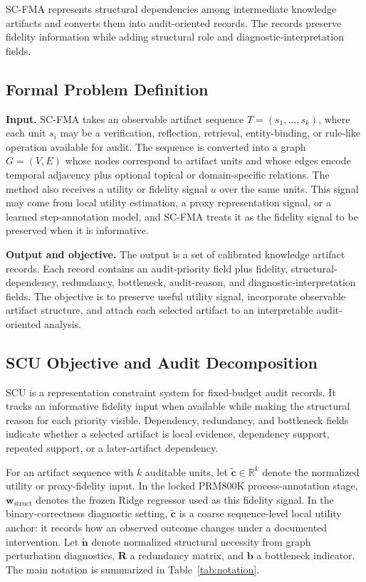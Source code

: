 \documentclass[a4paper,fleqn]{cas-sc}
\newcommand{\wstruct}{\ensuremath{\mathbf{w}_{\mathrm{struct}}}}
\begin{document}
SC-FMA represents structural dependencies among intermediate knowledge artifacts and converts them into audit-oriented records. The records preserve fidelity information while adding structural role and diagnostic-interpretation fields.

\subsection{Formal Problem Definition}

\textbf{Input.} SC-FMA takes an observable artifact sequence $T=(s_1,\ldots,s_k)$, where each unit $s_i$ may be a verification, reflection, retrieval, entity-binding, or rule-like operation available for audit. The sequence is converted into a graph $G=(V,E)$ whose nodes correspond to artifact units and whose edges encode temporal adjacency plus optional topical or domain-specific relations. The method also receives a utility or fidelity signal $u$ over the same units. This signal may come from local utility estimation, a proxy representation signal, or a learned step-annotation model, and SC-FMA treats it as the fidelity signal to be preserved when it is informative.

\textbf{Output and objective.} The output is a set of calibrated knowledge artifact records. Each record contains an audit-priority field plus fidelity, structural-dependency, redundancy, bottleneck, audit-reason, and diagnostic-interpretation fields. The objective is to preserve useful utility signal, incorporate observable artifact structure, and attach each selected artifact to an interpretable audit-oriented analysis.

\subsection{SCU Objective and Audit Decomposition}
\label{sec:scu-objective}

SCU is a representation constraint system for fixed-budget audit records. It tracks an informative fidelity input when available while making the structural reason for each priority visible. Dependency, redundancy, and bottleneck fields indicate whether a selected artifact is local evidence, dependency support, repeated support, or a later-artifact dependency.

For an artifact sequence with $k$ auditable units, let $\tilde{\mathbf{c}}\in\mathbb{R}^k$ denote the normalized utility or proxy-fidelity input. In the locked PRM800K process-annotation stage, \wstruct{} denotes the frozen Ridge regressor used as this fidelity signal. In the binary-correctness diagnostic setting, $\tilde{\mathbf{c}}$ is a coarse sequence-level local utility anchor: it records how an observed outcome changes under a documented intervention. Let $\tilde{\mathbf{n}}$ denote normalized structural necessity from graph perturbation diagnostics, $\mathbf{R}$ a redundancy matrix, and $\mathbf{b}$ a bottleneck indicator. The main notation is summarized in Table~\ref{tab:notation}.
\end{document}
